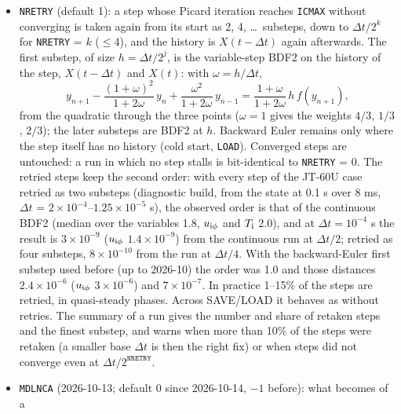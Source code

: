 \documentclass[11pt]{article}
\def\r#1{{\rm#1}}
\begin{document}
\begin{itemize}
  level by 4.8\% ($n_\r{z}$ by 8\%), uniformly in radius, and is the only noticeable difference; with NBI
  the core rotation is 40\% higher than in V5.52.20 (pinch sign, V5.61 fast-ion fixes).  The benchmark results quoted above for the
  wall row, the recycling and \texttt{PNsSUP(1)} = 0.0125 refer to the old defaults.  All benchmark numbers of this document
  before the item on the potato closure below were computed with \texttt{imodel\_neo(4)} = 0; that item gives the change by 1.
\item \texttt{NRETRY} (default 1): a step whose Picard iteration reaches \texttt{ICMAX} without
  converging is taken again from its start as 2, 4, \ldots\ substeps, down to $\Delta t/2^k$ for
  \texttt{NRETRY} = $k$ ($\le 4$), and the history is $X(t-\Delta t)$ again afterwards.  The first
  substep, of size $h = \Delta t/2^j$, is the variable-step BDF2 on the history of the step,
  $X(t-\Delta t)$ and $X(t)$: with $\omega = h/\Delta t$,
  \[
    y_{n+1} - \frac{(1+\omega)^2}{1+2\omega}\,y_n + \frac{\omega^2}{1+2\omega}\,y_{n-1}
    = \frac{1+\omega}{1+2\omega}\,h\,f(y_{n+1}),
  \]
  from the quadratic through the three points ($\omega = 1$ gives the weights $4/3$, $1/3$, $2/3$);
  the later substeps are BDF2 at $h$.  Backward Euler remains only where the step itself has no
  history (cold start, \texttt{LOAD}).  Converged steps are untouched: a run in which no step
  stalls is bit-identical to \texttt{NRETRY} = 0.  The retried steps keep the second order: with
  every step of the JT-60U case retried as two substeps (diagnostic build, from the state at 0.1 s
  over 8 ms, $\Delta t$ = $2\times10^{-4}$--$1.25\times10^{-5}$ s), the observed order is that of the
  continuous BDF2 (median over the variables 1.8, $u_{\r{i}\phi}$ and $T_\r{i}$ 2.0), and at
  $\Delta t = 10^{-4}$ s the result is $3\times10^{-9}$ ($u_{\r{i}\phi}$ $1.4\times10^{-9}$) from the
  continuous run at $\Delta t/2$; retried as four substeps, $8\times10^{-10}$ from the run at $\Delta t/4$.
  With the backward-Euler first substep used before (up to 2026-10) the order was 1.0 and those
  distances $2.4\times10^{-6}$ ($u_{\r{i}\phi}$ $3\times10^{-6}$) and $7\times10^{-7}$.  In practice
  1--15\% of the steps are retried, in quasi-steady phases.  Across SAVE/LOAD it behaves as
  without retries.  The summary of a
  run gives the number and share of retaken steps and the finest substep, and warns when more
  than 10\% of the steps were retaken (a smaller base $\Delta t$ is then the right fix) or when
  steps did not converge even at $\Delta t/2^{\texttt{NRETRY}}$.
\item \texttt{MDLNCA} (2026-10-13; default 0 since 2026-10-14, $-1$ before): what becomes of a

\end{itemize}
\end{document}
